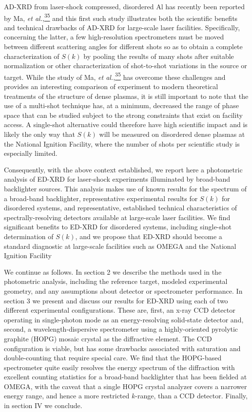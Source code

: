 AD-XRD from laser-shock compressed, disordered Al has recently been
reported by Ma, \emph{et
al.},\hyperref[t.-ma-et-al.-physical-review-letters-110-065001-2013.]{\textsuperscript{35}}
and this first such study illustrates both the scientific benefits and
technical drawbacks of AD-XRD for large-scale laser facilities.
Specifically, concerning the latter, a few high-resolution spectrometers
must be moved between different scattering angles for different shots so
as to obtain a complete characterization of \(S(k)\) by pooling the
results of many shots after suitable normalization or other
characterization of shot-to-shot variations in the source or target.
While the study of Ma, \emph{et
al.},\hyperref[t.-ma-et-al.-physical-review-letters-110-065001-2013.]{\textsuperscript{35}}
has overcome these challenges and provides an interesting comparison of
experiment to modern theoretical treatments of the structure of dense
plasmas, it is still important to note that the use of a multi-shot
technique has, at a minimum, decreased the range of phase space that can
be studied subject to the strong constraints that exist on facility
access. A single-shot alternative could therefore have high scientific
impact and is likely the only way that \(S(k)\) will be measured on
disordered dense plasmas at the National Ignition Facility, where the
number of shots per scientific study is especially limited.

Consequently, with the above context established, we report here a
photometric analysis of ED-XRD for laser-shock experiments illuminated
by broad-band backlighter sources. This analysis makes use of known
results for the spectrum of a broad-band backlighter, representative
experimental results for \(S(k)\) for disordered systems, and
representative, established technical characteristics of
spectrally-resolving detectors available at large-scale laser
facilities. We find significant benefits to ED-XRD for disordered
systems, including single-shot determination of \(S(k)\), and we propose
that ED-XRD should become a standard diagnostic at large-scale
facilities such as OMEGA and the National Ignition Facility

We continue as follows. In section 2 we describe the methods used in the
photometric analysis, including the reference target, modeled
experimental geometry, and any assumptions about detector or
spectrometer performance. In section 3 we present and discuss our
results for ED-XRD using each of two different experimental
configurations. These are, first, an x-ray CCD detector operating in
single-photon mode as an energy-resolving solid-state detector and,
second, a wavelength-dispersive spectrometer using a highly-oriented
pyrolytic graphite (HOPG) mosaic crystal as the diffractive element. The
CCD configuration is viable, but has some drawbacks associated with
saturation and double-counting that require special care. We find that
the HOPG-based spectrometer quite easily resolves the energy spectrum of
the diffraction with excellent counting statistics for a broad-band
backlighter that has been fielded at OMEGA, with the caveat that a
single HOPG crystal analyzer covers a narrower energy range, and hence a
more restricted \(k\)-range, than a CCD detector. Finally, in section IV
we conclude.

